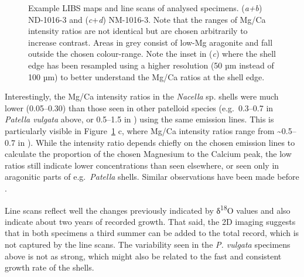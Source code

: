 \documentclass[
  authoryear,
  preprint,
  3p]{elsarticle}
\begin{document}
\begin{figure}


\caption{\label{fig-Nac_LIBS}Example LIBS maps and line scans of
analysed specimens. (\emph{a+b}) ND-1016-3 and (\emph{c}+\emph{d})
NM-1016-3. Note that the ranges of Mg/Ca intensity ratios are not
identical but are chosen arbitrarily to increase contrast. Areas in grey
consist of low-Mg aragonite and fall outside the chosen colour-range.
Note the inset in (\emph{c}) where the shell edge has been resampled
using a higher resolution (50 µm instead of 100 µm) to better understand
the Mg/Ca ratios at the shell edge.}

\end{figure}%

Interestingly, the Mg/Ca intensity ratios in the \emph{Nacella} sp.
shells were much lower (0.05--0.30) than those seen in other patelloid
species (e.g.~0.3--0.7 in \emph{Patella vulgata} above, or 0.5--1.5 in )
using the same emission lines. This is particularly visible in
Figure~\ref{fig-Nac_LIBS} c, where Mg/Ca intensity ratios range from
\textasciitilde0.5--0.7 in \citep{Hausmann2023-ih}). While the intensity
ratio depends chiefly on the chosen emission lines to calculate the
proportion of the chosen Magnesium to the Calcium peak, the low ratios
still indicate lower concentrations than seen elsewhere, or seen only in
aragonitic parts of e.g.~\emph{Patella} shells. Similar observations
have been made before \citep{Graniero2017-io}.

Line scans reflect well the changes previously indicated by
δ\textsuperscript{18}O values and also indicate about two years of
recorded growth. That said, the 2D imaging suggests that in both
specimens a third summer can be added to the total record, which is not
captured by the line scans. The variability seen in the \emph{P.
vulgata} specimens above is not as strong, which might also be related
to the fast and consistent growth rate of the shells.
\end{document}
